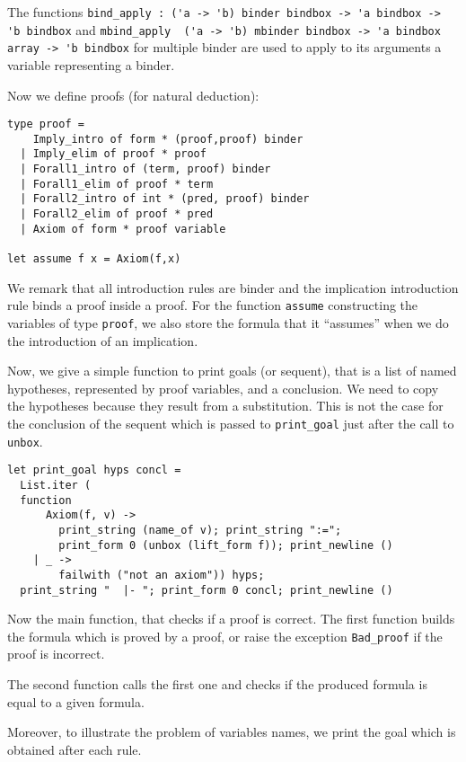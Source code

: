 \documentclass[11pt]{article}
\begin{document}
The functions
\verb#bind_apply : ('a -> 'b) binder bindbox -> 'a bindbox -> 'b bindbox# and
\verb#mbind_apply  ('a -> 'b) mbinder bindbox -> 'a bindbox array -> 'b bindbox#
for multiple binder are
used to apply to its arguments a variable representing a binder.

Now we define proofs (for natural deduction):
\begin{verbatim}
type proof =
    Imply_intro of form * (proof,proof) binder
  | Imply_elim of proof * proof
  | Forall1_intro of (term, proof) binder
  | Forall1_elim of proof * term
  | Forall2_intro of int * (pred, proof) binder
  | Forall2_elim of proof * pred
  | Axiom of form * proof variable

let assume f x = Axiom(f,x)
\end{verbatim}

We remark that all introduction rules are binder and the
implication introduction rule binds a proof inside a proof.
For the function \verb#assume# constructing the variables of type
\verb#proof#, we also store the formula that it ``assumes'' when we do
the introduction of an implication.

Now, we give a simple function to print goals (or sequent), that is a
list of named hypotheses, represented by proof variables, and a
conclusion. We need to copy the hypotheses because they result from a
substitution. This is not the case for the conclusion of the sequent
which is passed to \verb#print_goal# just after the call to \verb#unbox#.
\begin{verbatim}
let print_goal hyps concl =
  List.iter (
  function
      Axiom(f, v) ->
        print_string (name_of v); print_string ":=";
        print_form 0 (unbox (lift_form f)); print_newline ()
    | _ ->
        failwith ("not an axiom")) hyps;
  print_string "  |- "; print_form 0 concl; print_newline ()
\end{verbatim}

Now the main function, that checks if a proof is correct. The first
function builds the formula which is proved by a proof, or raise the
exception \verb#Bad_proof# if the proof is incorrect.

The second function calls the first one and checks if the produced
formula is equal to a given formula.

Moreover, to illustrate the problem of variables names, we print the
goal which is obtained after each rule.
\end{document}
